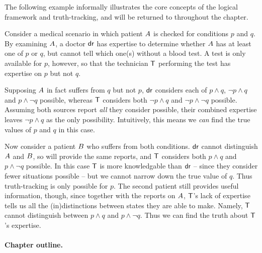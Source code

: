 
The following example informally illustrates the core concepts of the logical
framework and truth-tracking, and will be returned to throughout the chapter.

\begin{example}
    \label{ex_informal_example}

    Consider a medical scenario in which patient $A{}$ is checked for
    conditions $p$ and $q$. By examining $A{}$, a doctor
    $\mathsf{dr}{}$ has expertise to determine whether $A{}$ has at least one
    of $p$ or $q$, but cannot tell which one(s) without a blood test. A test is
    only available for $p$, however, so that the technician $\mathsf{T}{}$
    performing the test has expertise on $p$ but not $q$.

    Supposing $A{}$ in fact suffers from $q$ but not $p$, $\mathsf{dr}{}$
    considers each of $p \land q$, $\neg p \land q$ and $p \land \neg q$
    possible, whereas $\mathsf{T}{}$ considers both $\neg p \land q$ and $\neg p
    \land \neg q$ possible.
    Assuming both sources report \emph{all} they consider possible, their
    combined expertise leaves $\neg p \land q$ as the only
    possibility. Intuitively, this means we \emph{can} find the true values of
    $p$ and $q$ in this case.

    Now consider a patient $B{}$ who suffers from both conditions.
    $\mathsf{dr}{}$ cannot distinguish $A{}$ and $B{}$, so will provide
    the same reports, and $\mathsf{T}{}$ considers both $p \land q$ and $p \land
    \neg q$ possible. In this case $\mathsf{T}{}$ is more knowledgable than $\mathsf{dr}{}$
    -- since they consider fewer situations possible -- but we cannot narrow
    down the true value of $q$. Thus truth-tracking is only possible for $p$.
    The second patient still provides useful information, though, since
    together with the reports on $A{}$,
    $\mathsf{T}{}$'s lack of expertise tells us all the (in)distinctions between
    states they are able to make. Namely, $\mathsf{T}{}$ cannot distinguish between
    $p \land q$ and $p \land \neg q$. Thus we can find the truth about
    $\mathsf{T}{}$'s expertise.

\end{example}

\paragraph{Chapter outline.}

